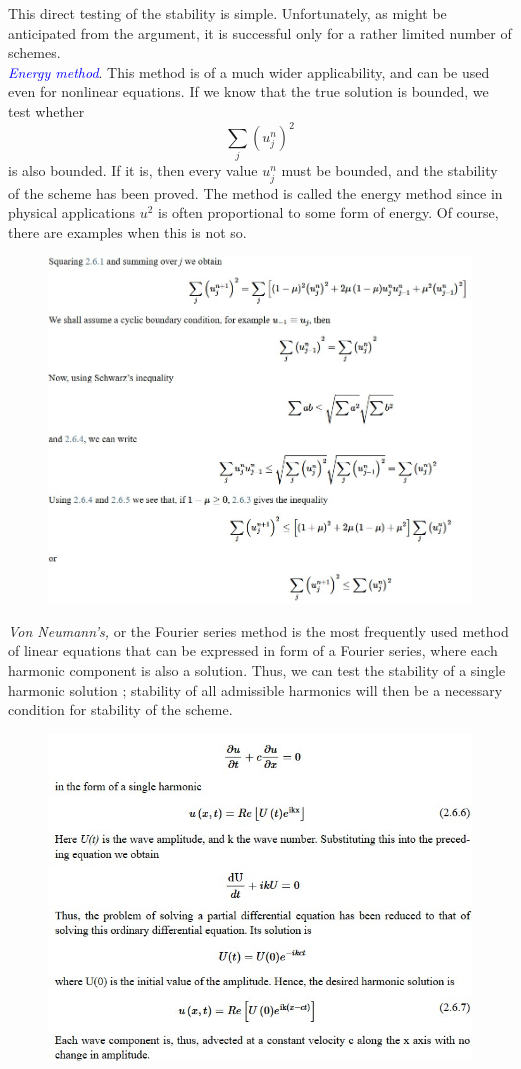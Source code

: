 This direct testing of the stability is simple. Unfortunately, as might be anticipated from the argument, it is successful only for a rather limited number of schemes.\\



\textcolor{Blue}{\textit{Energy method}}. This method is of a much wider applicability, and can be used even for nonlinear equations. If we know that the true solution is bounded, we test whether
$$\displaystyle\sum_j(u_j^n)^2$$
is also bounded.
If it is, then every value \(u_j^n\) must be bounded, and the stability of the scheme has been proved. The method is called the energy method since in physical applications \(u^2\) is often proportional to some form of energy. Of course, there are examples when this is not so.
\begin{figure}[htpb]
    \centering
    \includegraphics[width=0.75\linewidth]{uploads/Immagine 2024-12-07 101350.jpg}
\end{figure}
\textit{ Von Neumann’s,} or the Fourier series method is the most frequently used method of linear equations that can be expressed in form of a Fourier series, where each harmonic component is also a solution. Thus, we can test the stability of a single harmonic solution ; stability of all admissible harmonics will then be a necessary condition for stability of the scheme.
\begin{figure}[htpb]
    \centering
    \includegraphics[width=0.70\linewidth]{uploads/Immagine 2024-12-07 102403.jpg}
\end{figure}
